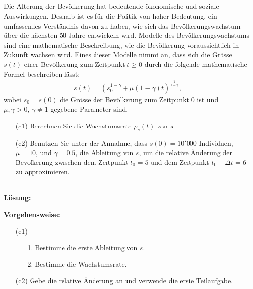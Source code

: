 \subsection*{}
Die Alterung der Bevölkerung hat bedeutende ökonomische und soziale Auswirkungen. Deshalb ist es für die Politik von hoher Bedeutung, ein umfassendes Verständnis davon zu haben, wie sich das Bevölkerungswachstum über die nächsten 50 Jahre entwickeln wird.
Modelle des Bevölkerungswachstums sind eine mathematische Beschreibung, wie die Bevölkerung voraussichtlich in Zukunft wachsen wird.
Eines dieser Modelle nimmt an, dass sich die Grösse $s(t)$ einer Bevölkerung zum Zeitpunkt $t \geq 0$ durch die folgende mathematische Formel beschreiben lässt:
\begin{align*}
	s(t)
	=
	\left(s_0^{1- \gamma} + \mu (1 - \gamma)  t \right)^{\frac{1}{1- \gamma}},
\end{align*}
wobei $s_0 = s(0)$ die Grösse der Bevölkerung zum Zeitpunkt $0$ ist und $\mu, \gamma > 0, \ \gamma \neq 1$ gegebene Parameter sind.
\begin{enumerate}
	\item[(c1)] Berechnen Sie die Wachstumsrate $ \rho_s(t) $ von $ s $.
	\item[(c2)] Benutzen Sie unter der Annahme, dass $s(0) = 10'000 $ Individuen, $\mu = 10$, und $\gamma = 0.5$, die Ableitung von $s$, um die relative Änderung der Bevölkerung zwischen dem Zeitpunkt $t_0 = 5 $ und dem Zeitpunkt $t_0 + \Delta t = 6$ zu approximieren.
\end{enumerate}
\ \\
\textbf{Lösung:}
\begin{mdframed}
\underline{\textbf{Vorgehensweise:}}
\begin{enumerate}
\item[(c1)] 
\begin{enumerate}
	\item[1.] Bestimme die erste Ableitung von $s$.
	\item[2.] Bestimme die Wachstumsrate.
\end{enumerate}
\item[(c2)] Gebe die relative Änderung an und verwende die erste Teilaufgabe.
\end{enumerate}
\end{mdframed}

